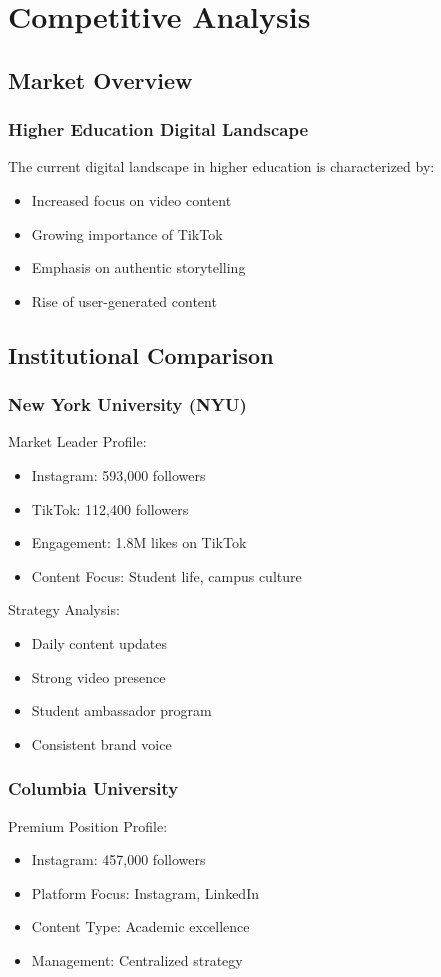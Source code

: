 \documentclass[12pt]{report}
\begin{document}
\chapter{Competitive Analysis}

\section{Market Overview}
\subsection{Higher Education Digital Landscape}
The current digital landscape in higher education is characterized by:
\begin{itemize}
    \item Increased focus on video content
    \item Growing importance of TikTok
    \item Emphasis on authentic storytelling
    \item Rise of user-generated content
\end{itemize}

\section{Institutional Comparison}
\subsection{New York University (NYU)}
Market Leader Profile:
\begin{itemize}
    \item Instagram: 593,000 followers
    \item TikTok: 112,400 followers
    \item Engagement: 1.8M likes on TikTok
    \item Content Focus: Student life, campus culture
\end{itemize}

Strategy Analysis:
\begin{itemize}
    \item Daily content updates
    \item Strong video presence
    \item Student ambassador program
    \item Consistent brand voice
\end{itemize}

\subsection{Columbia University}
Premium Position Profile:
\begin{itemize}
    \item Instagram: 457,000 followers
    \item Platform Focus: Instagram, LinkedIn
    \item Content Type: Academic excellence
    \item Management: Centralized strategy
\end{itemize}
\end{document}
